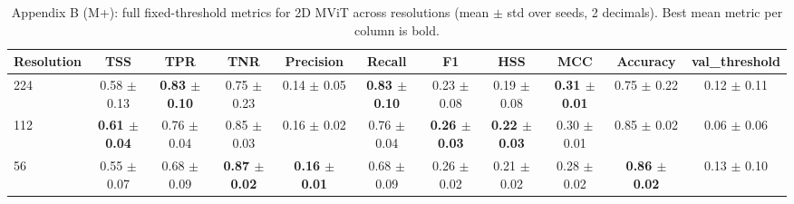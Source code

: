 \begin{table}[p]
\centering
\scriptsize
\setlength{\tabcolsep}{3.5pt}
\caption{Appendix B (M+): full fixed-threshold metrics for 2D MViT across resolutions (mean $\pm$ std over seeds, 2 decimals). Best mean metric per column is bold.}
\label{tab:appB_full_mplus}
\begin{tabular}{lcccccccccc}
\toprule
Resolution & TSS & TPR & TNR & Precision & Recall & F1 & HSS & MCC & Accuracy & val\_threshold \\
\midrule
224 & 0.58 $\pm$ 0.13 & \textbf{0.83 $\pm$ 0.10} & 0.75 $\pm$ 0.23 & 0.14 $\pm$ 0.05 & \textbf{0.83 $\pm$ 0.10} & 0.23 $\pm$ 0.08 & 0.19 $\pm$ 0.08 & \textbf{0.31 $\pm$ 0.01} & 0.75 $\pm$ 0.22 & 0.12 $\pm$ 0.11 \\
112 & \textbf{0.61 $\pm$ 0.04} & 0.76 $\pm$ 0.04 & 0.85 $\pm$ 0.03 & 0.16 $\pm$ 0.02 & 0.76 $\pm$ 0.04 & \textbf{0.26 $\pm$ 0.03} & \textbf{0.22 $\pm$ 0.03} & 0.30 $\pm$ 0.01 & 0.85 $\pm$ 0.02 & 0.06 $\pm$ 0.06 \\
56 & 0.55 $\pm$ 0.07 & 0.68 $\pm$ 0.09 & \textbf{0.87 $\pm$ 0.02} & \textbf{0.16 $\pm$ 0.01} & 0.68 $\pm$ 0.09 & 0.26 $\pm$ 0.02 & 0.21 $\pm$ 0.02 & 0.28 $\pm$ 0.02 & \textbf{0.86 $\pm$ 0.02} & 0.13 $\pm$ 0.10 \\
\bottomrule
\end{tabular}
\end{table}
